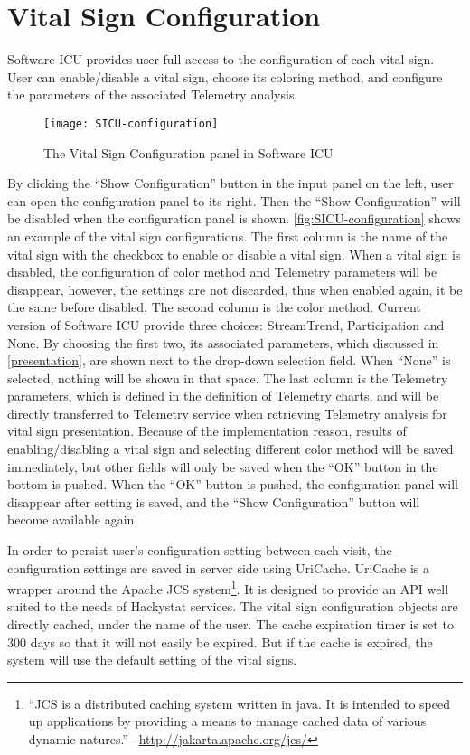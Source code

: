 \section{Vital Sign Configuration}
\label{SICUconfiguration}
Software ICU provides user full access to the configuration of each vital sign. User can enable/disable a vital sign, choose its coloring method, and configure the parameters of the associated Telemetry analysis. 

\begin{figure}[htbp]
   \centering
   \texttt{[image: SICU-configuration]} 
   \caption{The Vital Sign Configuration panel in Software ICU}
   \label{fig:SICU-configuration}
\end{figure}

By clicking the ``Show Configuration'' button in the input panel on the left, user can open the configuration panel to its right. Then the ``Show Configuration'' will be disabled when the configuration panel is shown. \autoref{fig:SICU-configuration} shows an example of the vital sign configurations. The first column is the name of the vital sign with the checkbox to enable or disable a vital sign. When a vital sign is disabled, the configuration of color method and Telemetry parameters will be disappear, however, the settings are not discarded, thus when enabled again, it be the same before disabled. The second column is the color method. Current version of Software ICU provide three choices: StreamTrend, Participation and None. By choosing the first two, its associated parameters, which discussed in \autoref{presentation}, are shown next to the drop-down selection field. When ``None'' is selected, nothing will be shown in that space. The last column is the Telemetry parameters, which is defined in the definition of Telemetry charts, and will be directly transferred to Telemetry service when retrieving Telemetry analysis for vital sign presentation. Because of the implementation reason, results of enabling/disabling a vital sign and selecting different color method will be saved immediately, but other fields will only be saved when the ``OK'' button in the bottom is pushed. When the ``OK'' button is pushed, the configuration panel will disappear after setting is saved, and the ``Show Configuration'' button will become available again.

In order to persist user's configuration setting between each visit, the configuration settings are saved in server side using UriCache. UriCache is a wrapper around the Apache JCS system\footnote{``JCS is a distributed caching system written in java. It is intended to speed up applications by providing a means to manage cached data of various dynamic natures.'' --\url{http://jakarta.apache.org/jcs/}}. It is designed to provide an API well suited to the needs of Hackystat services. The vital sign configuration objects are directly cached, under the name of the user. The cache expiration timer is set to 300 days so that it will not easily be expired. But if the cache is expired, the system will use the default setting of the vital signs.

